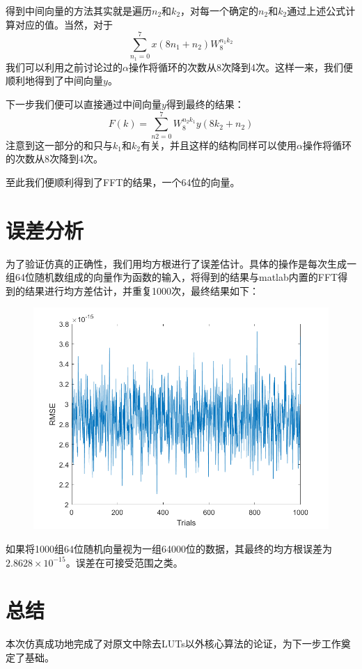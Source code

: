 \documentclass[a4paper, 12pt]{ctexart}
\begin{document}
得到中间向量的方法其实就是遍历$n_2$和$k_2$，对每一个确定的$n_2$和$k_2$通过上述公式计算对应的值。当然，对于
$$\sum_{n_1 = 0}^{7} x(8n_1 + n_2)W_8^{n_1k_2}$$
我们可以利用之前讨论过的$\alpha$操作将循环的次数从8次降到4次。这样一来，我们便顺利地得到了中间向量$y$。

下一步我们便可以直接通过中间向量$y$得到最终的结果：
$$F(k) = \sum_{n2 = 0}^{7} W_8^{n_2k_1} y(8k_2 + n_2)$$
注意到这一部分的和只与$k_1$和$k_2$有关，并且这样的结构同样可以使用$\alpha$操作将循环的次数从8次降到4次。

至此我们便顺利得到了FFT的结果，一个64位的向量。

\section{误差分析}

为了验证仿真的正确性，我们用均方根进行了误差估计。具体的操作是每次生成一组64位随机数组成的向量作为函数的输入，将得到的结果与matlab内置的FFT得到的结果进行均方差估计，并重复1000次，最终结果如下：
\begin{figure}[h]
    \centering
    \includegraphics[width=0.8\linewidth]{error.png}
\end{figure}

如果将1000组64位随机向量视为一组64000位的数据，其最终的均方根误差为$2.8628 \times 10^{-15}$。误差在可接受范围之类。

\section{总结}

本次仿真成功地完成了对原文中除去LUTs以外核心算法的论证，为下一步工作奠定了基础。
\end{document}
